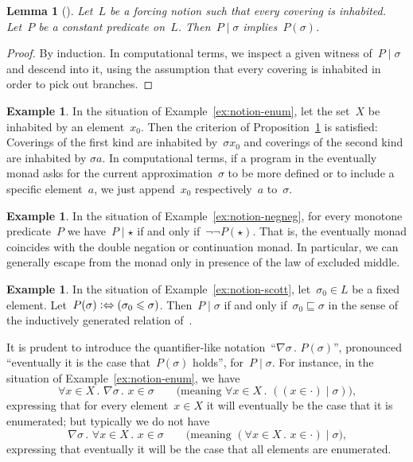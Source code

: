 \documentclass[com,11pt,crcready]{iosart2x}
\theoremstyle{definition}
\newtheorem{example}[definition]{Example}
\theoremstyle{plain}
\newtheorem{lemma}[definition]{Lemma}
\theoremstyle{remark}
\newcommand{\?}{\,{:}\,}
\renewcommand{\_}{\mathpunct{.}\,}
\begin{document}
\begin{lemma}[{\cite[Proposition~V.3.2]{joyal-tierney:grothendieck}}]\label{prop:cov-open}
Let~$L$ be a forcing notion such that every covering is inhabited. Let~$P$ be a
constant predicate on~$L$. Then~$P \mid \sigma$ implies~$P(\sigma)$.
\end{lemma}

\begin{proof}By induction. In computational terms, we inspect a given witness
of~$P \mid \sigma$ and descend into it, using the assumption that every
covering is inhabited in order to pick out branches.
\end{proof}

\begin{example}In the situation of Example~\ref{ex:notion-enum}, let the
set~$X$ be inhabited by an element~$x_0$. Then the criterion of
Proposition~\ref{prop:cov-open} is satisfied: Coverings of the first kind are
inhabited by~$\sigma x_0$ and coverings of the second kind are inhabited
by $\sigma a$. In computational terms, if a program in the eventually
monad asks for the current approximation~$\sigma$ to be more defined or to include a
specific element~$a$, we just append~$x_0$ respectively~$a$ to~$\sigma$.
\end{example}

\begin{example}In the situation of Example~\ref{ex:notion-negneg}, for every
monotone predicate~$P$ we have~$P \mid \star$ if and only if~$\neg\neg
P(\star)$. That is, the eventually monad coincides with the double negation or
continuation monad. In particular, we can generally escape from the monad only
in presence of the law of excluded middle.\end{example}

\begin{example}In the situation of Example~\ref{ex:notion-scott},
let~$\sigma_0 \in L$ be a fixed element. Let~$P(\sigma)
\vcentcolon\Leftrightarrow (\sigma_0 \leq \sigma)$. Then~$P \mid \sigma$ if
and only if~$\sigma_0 \sqsubseteq \sigma$ in the sense of the inductively
generated relation of~\cite[Definition~18]{wessel-schuster:radical}.\end{example}

It is prudent to introduce the quantifier-like notation~``$\nabla \sigma\_
P(\sigma)$'', pronounced ``eventually it is the case that~$P(\sigma)$ holds'',
for~$P \mid \sigma$. For instance, in the situation of
Example~\ref{ex:notion-enum}, we have
\[ \forall x \in X\_ \nabla \sigma\_ x \in \sigma
\qquad\text{(meaning $\forall x \in X\_ ((x \in \cdot) \mid \sigma)$),} \]
expressing that for every element~$x \in X$ it will eventually be the case that
it is enumerated; but typically we do not have
\[ \nabla \sigma\_ \forall x \in X\_ x \in \sigma
\qquad\text{(meaning $(\forall x \in X\_ x \in \cdot) \mid \sigma$),} \]
expressing that eventually it will be the case that all elements are
enumerated.
\end{document}
